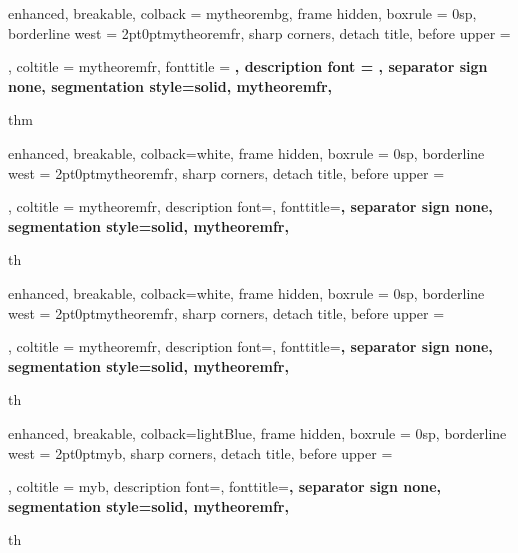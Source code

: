 % 






{%
	enhanced,
	breakable,
	colback = mytheorembg,
	frame hidden,
	boxrule = 0sp,
	borderline west = {2pt}{0pt}{mytheoremfr},
	sharp corners,
	detach title,
	before upper = \tcbtitle\par\smallskip,
	coltitle = mytheoremfr,
	fonttitle = \bfseries{}\selectfont,
	description font = \mdseries{}\selectfont,
	separator sign none,
	segmentation style={solid, mytheoremfr},
}
{thm}

{
	enhanced,
	breakable,
	colback=white,
	frame hidden,
	boxrule = 0sp,
	borderline west = {2pt}{0pt}{mytheoremfr},
	sharp corners,
	detach title,
	before upper = \tcbtitle\par\smallskip,
	coltitle = mytheoremfr,
	description font=\selectfont,
	fonttitle=\selectfont\bfseries,
	separator sign none,
	segmentation style={solid, mytheoremfr},
}
{th}


{
	enhanced,
	breakable,
	colback=white,
	frame hidden,
	boxrule = 0sp,
	borderline west = {2pt}{0pt}{mytheoremfr},
	sharp corners,
	detach title,
	before upper = \tcbtitle\par\smallskip,
	coltitle = mytheoremfr,
	description font=\selectfont,
	fonttitle=\selectfont\bfseries,
	separator sign none,
	segmentation style={solid, mytheoremfr},
}
{th}




{
	enhanced,
	breakable,
	colback=lightBlue,
	frame hidden,
	boxrule = 0sp,
	borderline west = {2pt}{0pt}{myb},
	sharp corners,
	detach title,
	before upper = \tcbtitle\par\smallskip,
	coltitle = myb,
	description font=\selectfont,
	fonttitle=\selectfont\bfseries,
	separator sign none,
	segmentation style={solid, mytheoremfr},
}
{th}



